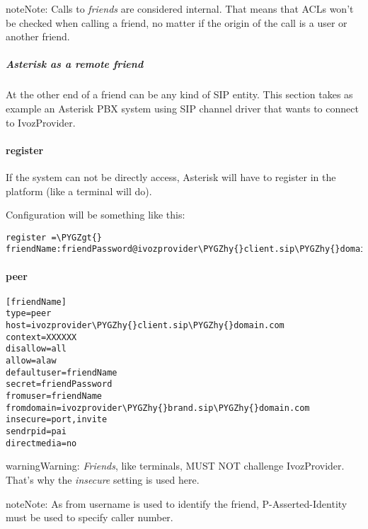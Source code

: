 \documentclass[letterpaper,10pt,english]{sphinxmanual}
\def\PYGZgt{\char`\>}
\def\PYGZhy{\char`\-}
\begin{document}
\begin{notice}{note}{Note:}
Calls to \emph{friends} are considered internal. That means that ACLs won't
be checked when calling a friend, no matter if the origin of the call
is a user or another friend.
\end{notice}


\subparagraph{Asterisk as a remote friend}
\label{administration_portal/client/vpbx/routing_endpoints/friends/remote_friends:asterisk-as-a-remote-friend}
At the other end of a friend can be any kind of SIP entity. This section takes
as example an Asterisk PBX system using SIP channel driver that wants to connect
to IvozProvider.
\paragraph{register}

If the system can not be directly access, Asterisk will have to register in the
platform (like a terminal will do).

Configuration will be something like this:

\begin{Verbatim}[commandchars=\\\{\}]
register =\PYGZgt{} friendName:friendPassword@ivozprovider\PYGZhy{}client.sip\PYGZhy{}domain.com
\end{Verbatim}
\paragraph{peer}

\begin{Verbatim}[commandchars=\\\{\}]
[friendName]
type=peer
host=ivozprovider\PYGZhy{}client.sip\PYGZhy{}domain.com
context=XXXXXX
disallow=all
allow=alaw
defaultuser=friendName
secret=friendPassword
fromuser=friendName
fromdomain=ivozprovider\PYGZhy{}brand.sip\PYGZhy{}domain.com
insecure=port,invite
sendrpid=pai
directmedia=no
\end{Verbatim}

\begin{notice}{warning}{Warning:}
\emph{Friends}, like terminals, MUST NOT challenge IvozProvider. That's
why the \emph{insecure} setting is used here.
\end{notice}

\begin{notice}{note}{Note:}
As from username is used to identify the friend, P-Asserted-Identity must be used to specify caller number.
\end{notice}
\end{document}
